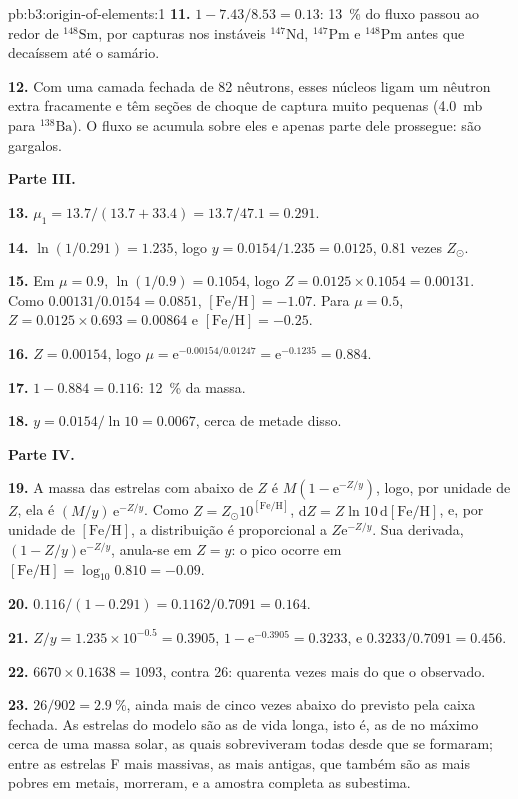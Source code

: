 \begin{solution}{pb:b3:origin-of-elements:1}
\textbf{11.} $1 - 7.43/8.53 = \num{0.13}$: \qty{13}{\percent} do fluxo passou
ao redor de $^{148}\mathrm{Sm}$, por capturas nos instáveis
$^{147}\mathrm{Nd}$, $^{147}\mathrm{Pm}$ e $^{148}\mathrm{Pm}$ antes
que decaíssem até o samário.

\textbf{12.} Com uma camada fechada de 82 nêutrons, esses núcleos ligam um
nêutron extra fracamente e têm seções de choque de captura muito pequenas (\qty{4.0}{mb}
para $^{138}\mathrm{Ba}$). O fluxo se acumula sobre eles e apenas parte dele
prossegue: são gargalos.

\textbf{Parte III.}

\textbf{13.} $\mu_1 = 13.7/(13.7 + 33.4) = 13.7/47.1 = \num{0.291}$.

\textbf{14.} $\ln(1/0.291) = \num{1.235}$, logo $y = 0.0154/1.235 = \num{0.0125}$,
\num{0.81} vezes $Z_\odot$.

\textbf{15.} Em $\mu = 0.9$, $\ln(1/0.9) = 0.1054$, logo $Z = 0.0125\times0.1054 =
\num{0.00131}$. Como $0.00131/0.0154 = 0.0851$, $[\mathrm{Fe/H}] =
-1.07$. Para $\mu = 0.5$, $Z = 0.0125\times0.693 = \num{0.00864}$ e
$[\mathrm{Fe/H}] = -0.25$.

\textbf{16.} $Z = 0.00154$, logo $\mu = \mathrm{e}^{-0.00154/0.01247} =
\mathrm{e}^{-0.1235} = \num{0.884}$.

\textbf{17.} $1 - 0.884 = \num{0.116}$: \qty{12}{\percent} da massa.

\textbf{18.} $y = 0.0154/\ln 10 = \num{0.0067}$, cerca de metade disso.

\textbf{Parte IV.}

\textbf{19.} A massa das estrelas com  abaixo de $Z$ é
$M(1 - \mathrm{e}^{-Z/y})$, logo, por unidade de $Z$, ela é
$(M/y)\,\mathrm{e}^{-Z/y}$. Como $Z = Z_\odot10^{[\mathrm{Fe/H}]}$,
$\mathrm{d}Z = Z\ln 10\,\mathrm{d}[\mathrm{Fe/H}]$, e, por unidade de
$[\mathrm{Fe/H}]$, a distribuição é proporcional a
$Z\mathrm{e}^{-Z/y}$. Sua derivada,
$(1 - Z/y)\mathrm{e}^{-Z/y}$, anula-se em $Z = y$: o pico ocorre em
$[\mathrm{Fe/H}] = \log_{10}0.810 = -0.09$.

\textbf{20.} $\num{0.116}/(1 - 0.291) = 0.1162/0.7091 = \num{0.164}$.

\textbf{21.} $Z/y = 1.235\times10^{-0.5} = 0.3905$, $1 - \mathrm{e}^{-0.3905} =
0.3233$, e $0.3233/0.7091 = \num{0.456}$.

\textbf{22.} $6670\times0.1638 = 1093$, contra 26: quarenta vezes mais do que o observado.

\textbf{23.} $26/902 = \qty{2.9}{\percent}$, ainda mais de cinco vezes abaixo
do previsto pela caixa fechada. As estrelas do modelo são as de vida longa, isto é, as de no máximo
cerca de uma massa solar, as quais sobreviveram todas desde que se formaram; entre
as estrelas F mais massivas, as mais antigas, que também são as mais
pobres em metais, morreram, e a amostra completa as subestima.


\end{solution}
